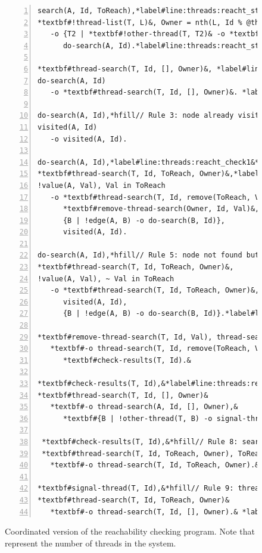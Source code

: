 \begin{figure}[h]
\begin{Verbatim}[numbers=left,fontsize=\codesize,commandchars=*\#\&]
search(A, Id, ToReach),*label#line:threads:reacht_start1&*hfill// Rule 1: initialize search
*textbf#!thread-list(T, L)&, Owner = nth(L, Id % @threads)*hfill// Allocate search to a thread
   -o {T2 | *textbf#!other-thread(T, T2)& -o *textbf#thread-search(T2, Id, ToReach, Owner)&},*label#line:threads:reacht_threads&
      do-search(A, Id).*label#line:threads:reacht_start2&

*textbf#thread-search(T, Id, [], Owner)&, *label#line:threads:reacht_prune1&*hfill// Rule 2: search completed
do-search(A, Id)
   -o *textbf#thread-search(T, Id, [], Owner)&. *label#line:threads:reacht_prune2&

do-search(A, Id),*hfill// Rule 3: node already visited
visited(A, Id)
   -o visited(A, Id).

do-search(A, Id),*label#line:threads:reacht_check1&*label#line:bfs_join1&*hfill// Rule 4: node found
*textbf#thread-search(T, Id, ToReach, Owner)&,*label#line:threads:reacht_join2&
!value(A, Val), Val in ToReach
   -o *textbf#thread-search(T, Id, remove(ToReach, Val), Owner)&,
      *textbf#remove-thread-search(Owner, Id, Val)&,*hfill// Tell owner thread about it.*label#line:threads:reacht_remove&
      {B | !edge(A, B) -o do-search(B, Id)},
      visited(A, Id).

do-search(A, Id),*hfill// Rule 5: node not found but propagate search
*textbf#thread-search(T, Id, ToReach, Owner)&,
!value(A, Val), ~ Val in ToReach
   -o *textbf#thread-search(T, Id, ToReach, Owner)&,
      visited(A, Id),
      {B | !edge(A, B) -o do-search(B, Id)}.*label#line:threads:reacht_check2&

*textbf#remove-thread-search(T, Id, Val), thread-search(T, Id, ToReach, Owner)&*hfill// Rule 6: node found
   *textbf#-o thread-search(T, Id, remove(ToReach, Val), Owner),&
      *textbf#check-results(T, Id).&

*textbf#check-results(T, Id),&*label#line:threads:reacht_reached1&*hfill// Rule 7: search is completed
*textbf#thread-search(T, Id, [], Owner)&
   *textbf#-o thread-search(A, Id, [], Owner),&
      *textbf#{B | !other-thread(T, B) -o signal-thread(B, Id)}.&*label#line:threads:reacht_reached2&

 *textbf#check-results(T, Id),&*hfill// Rule 8: search not completed yet
 *textbf#thread-search(T, Id, ToReach, Owner), ToReach <> []&
   *textbf#-o thread-search(T, Id, ToReach, Owner).&

*textbf#signal-thread(T, Id),&*hfill// Rule 9: thread knows search is done*label#line:threads:reacht_knows1&
*textbf#thread-search(T, Id, ToReach, Owner)&
   *textbf#-o thread-search(T, Id, [], Owner).& *label#line:threads:reacht_knows2&
\end{Verbatim}
\caption{Coordinated version of the reachability checking program. Note
that  represent the number of threads in the system.}
\label{code:threads:reach_threads}
\end{figure}

